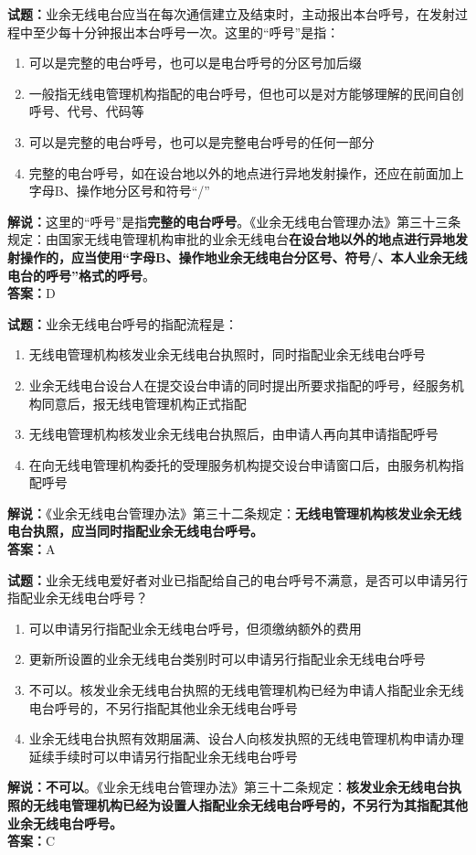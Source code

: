 \documentclass{ctexbook}
\begin{document}
\bigskip


\noindent\textbf{试题：}业余无线电台应当在每次通信建立及结束时，主动报出本台呼号，在发射过程中至少每十分钟报出本台呼号一次。这里的“呼号”是指：
\begin{enumerate}[leftmargin=3em]
	\item 可以是完整的电台呼号，也可以是电台呼号的分区号加后缀
	\item 一般指无线电管理机构指配的电台呼号，但也可以是对方能够理解的民间自创呼号、代号、代码等
	\item 可以是完整的电台呼号，也可以是完整电台呼号的任何一部分
	\item 完整的电台呼号，如在设台地以外的地点进行异地发射操作，还应在前面加上字母B、操作地分区号和符号“/”
\end{enumerate}
\noindent\textbf{解说：}这里的“呼号”是指\textbf{完整的电台呼号}。《业余无线电台管理办法》第三十三条规定：由国家无线电管理机构审批的业余无线电台\textbf{在设台地以外的地点进行异地发射操作的，应当使用“字母B、操作地业余无线电台分区号、符号/、本人业余无线电台的呼号”格式的呼号}。\\\noindent\textbf{答案：}D



\bigskip


\noindent\textbf{试题：}业余无线电台呼号的指配流程是：
\begin{enumerate}[leftmargin=3em]
	\item 无线电管理机构核发业余无线电台执照时，同时指配业余无线电台呼号
	\item 业余无线电台设台人在提交设台申请的同时提出所要求指配的呼号，经服务机构同意后，报无线电管理机构正式指配
	\item 无线电管理机构核发业余无线电台执照后，由申请人再向其申请指配呼号
	\item 在向无线电管理机构委托的受理服务机构提交设台申请窗口后，由服务机构指配呼号
\end{enumerate}
\noindent\textbf{解说：}《业余无线电台管理办法》第三十二条规定：\textbf{无线电管理机构核发业余无线电台执照，应当同时指配业余无线电台呼号。}\\\noindent\textbf{答案：}A



\bigskip


\noindent\textbf{试题：}业余无线电爱好者对业已指配给自己的电台呼号不满意，是否可以申请另行指配业余无线电台呼号？
\begin{enumerate}[leftmargin=3em]
	\item 可以申请另行指配业余无线电台呼号，但须缴纳额外的费用
	\item 更新所设置的业余无线电台类别时可以申请另行指配业余无线电台呼号
	\item 不可以。核发业余无线电台执照的无线电管理机构已经为申请人指配业余无线电台呼号的，不另行指配其他业余无线电台呼号
	\item 业余无线电台执照有效期届满、设台人向核发执照的无线电管理机构申请办理延续手续时可以申请另行指配业余无线电台呼号
\end{enumerate}
\textbf{解说：不可以}。《业余无线电台管理办法》第三十二条规定：\textbf{核发业余无线电台执照的无线电管理机构已经为设置人指配业余无线电台呼号的，不另行为其指配其他业余无线电台呼号。}\\\noindent\textbf{答案：}C
\end{document}

